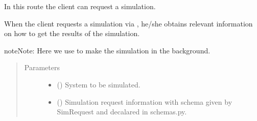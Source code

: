 \documentclass[a4paper,landscape,10pt,english]{sphinxmanual}
\begin{document}
\begin{fulllineitems}
\label{\detokenize{code_docs/simulation_api.controller:simulation_api.controller.main.api_simulate_sim_system}}
In this route the client can request a simulation.

When the client requests a simulation via ,
he/she obtains relevant information on how to get the results of the
simulation.

\begin{sphinxadmonition}{note}{Note:}
Here we use  to make the simulation in the
background.
\end{sphinxadmonition}
\begin{quote}\begin{description}
\item[{Parameters}] \leavevmode\begin{itemize}
\item {} 
 ({\hyperref[\detokenize{code_docs/simulation_api.controller:simulation_api.controller.schemas.SimSystem}]{}}) \textendash{} System to be simulated.

\item {} 
 ({\hyperref[\detokenize{code_docs/simulation_api.controller:simulation_api.controller.schemas.SimRequest}]{}}) \textendash{} Simulation request information with schema given by SimRequest and
decalared in schemas.py.


\end{itemize}
\end{description}
\end{quote}
\end{fulllineitems}
\end{document}

